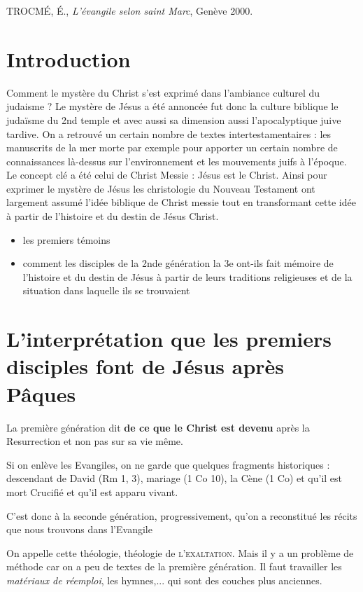 TROCMÉ, É., \emph{L'évangile selon saint Marc}, Genève 2000.
 
\hypertarget{introduction}{%
\section{Introduction}\label{introduction}}

 Comment le mystère du Christ s'est exprimé dans l'ambiance culturel du judaisme ?
 Le mystère de Jésus a été annoncée fut donc la culture biblique le judaïsme du 2nd temple et avec aussi sa dimension aussi l'apocalyptique juive tardive. On a retrouvé un certain nombre de textes intertestamentaires  : les manuscrits de la mer morte par exemple pour apporter un certain nombre de connaissances là-dessus sur l'environnement et les mouvements juifs à l'époque. 
 Le concept clé a été celui de Christ Messie :  Jésus est le Christ. Ainsi pour exprimer le mystère de Jésus les christologie du Nouveau Testament ont largement assumé l'idée biblique de Christ messie tout en transformant cette idée à partir de l'histoire et du destin de Jésus Christ.
 \begin{itemize}
     \item les premiers témoins 
     \item comment les disciples de la 2nde génération la 3e ont-ils fait mémoire de l'histoire et du destin de Jésus à partir de leurs traditions religieuses et de la situation dans laquelle ils se trouvaient
 \end{itemize}

  \section{L'interprétation que les premiers disciples font de Jésus  après Pâques}
   La première génération dit \textbf{de ce que le Christ est devenu} après la Resurrection et non pas sur sa vie même.
 \begin{Ex}
 Si on enlève les Evangiles, on ne garde que quelques fragments historiques : descendant de David (Rm 1, 3), mariage (1 Co 10), la Cène (1 Co) et qu'il est mort Crucifié et qu'il est apparu vivant. 
 \end{Ex}  
 C'est donc à la seconde génération, progressivement, qu'on a reconstitué les récits que nous trouvons dans l'Evangile
   
 On appelle cette théologie, théologie de \textsc{l'exaltation}. Mais il y a un problème de méthode car on a peu de textes de la première génération. Il faut travailler les \textit{matériaux de réemploi}, les hymnes,... qui sont des couches plus anciennes. 
 
